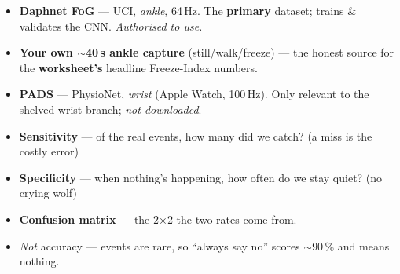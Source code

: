 \documentclass[11pt]{article}
\begin{document}
\begin{minipage}[t]{0.49\textwidth}
  \begin{tcolorbox}[enhanced, equal height group=dm, colback=white, colframe=teal,
    boxrule=0.9pt, arc=3pt, left=9pt, right=9pt, top=6pt, bottom=6pt,
    fonttitle=\bfseries\color{white}, colbacktitle=teal,
    attach boxed title to top left={xshift=8pt, yshift=-3pt},
    boxed title style={colback=teal, arc=2pt, boxrule=0pt}, title={\,5\ \ DATA}]
    \begin{itemize}
      \item \textbf{Daphnet FoG} — UCI, \emph{ankle}, 64\,Hz. The \textbf{primary} dataset; trains \& validates the CNN. \emph{Authorised to use.}
      \item \textbf{Your own $\sim$40\,s ankle capture} (still/walk/freeze) — the honest source for the \textbf{worksheet's} headline Freeze-Index numbers.
      \item \textbf{PADS} — PhysioNet, \emph{wrist} (Apple Watch, 100\,Hz). Only relevant to the shelved wrist branch; \emph{not downloaded}.
    \end{itemize}
  \end{tcolorbox}
\end{minipage}\hfill
\begin{minipage}[t]{0.49\textwidth}
  \begin{tcolorbox}[enhanced, equal height group=dm, colback=white, colframe=teal,
    boxrule=0.9pt, arc=3pt, left=9pt, right=9pt, top=6pt, bottom=6pt,
    fonttitle=\bfseries\color{white}, colbacktitle=teal,
    attach boxed title to top left={xshift=8pt, yshift=-3pt},
    boxed title style={colback=teal, arc=2pt, boxrule=0pt}, title={\,6\ \ METRICS}]
    \begin{itemize}
      \item \textbf{Sensitivity} — of the real events, how many did we catch? (a miss is the costly error)
      \item \textbf{Specificity} — when nothing's happening, how often do we stay quiet? (no crying wolf)
      \item \textbf{Confusion matrix} — the 2×2 the two rates come from.
      \item {\color{muted}\emph{Not} accuracy — events are rare, so ``always say no'' scores $\sim$90\,\% and means nothing.}
    \end{itemize}
  \end{tcolorbox}
\end{minipage}
\end{document}
